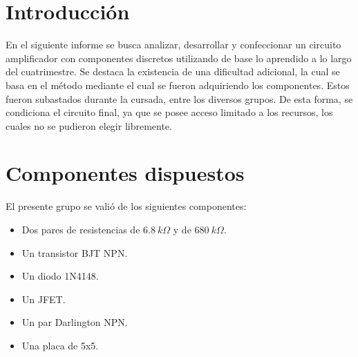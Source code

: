 







\tableofcontents
\newpage

\section{Introducción}
En el siguiente informe se busca analizar, desarrollar y confeccionar un circuito amplificador con componentes discretos utilizando de base lo aprendido a lo largo del cuatrimestre. Se destaca la existencia de una dificultad adicional, la cual se basa en el método mediante el cual se fueron adquiriendo los componentes. Estos fueron subastados durante la cursada, entre los diversos grupos. De esta forma, se condiciona el circuito final, ya que se posee acceso limitado a los recursos, los cuales no se pudieron elegir libremente.

\section{Componentes dispuestos}
El presente grupo se valió de los siguientes componentes:
\begin{itemize}
	\item Dos pares de resistencias de $6.8 \ k\Omega$ y de $680 \ k\Omega$.
	\item Un transistor BJT NPN. 
	\item Un diodo 1N4148.
	\item Un JFET.
	\item Un par Darlington NPN.
	\item Una placa de 5x5.
\end{itemize}

